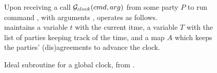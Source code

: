 \begin{figure}[ht]
  \begin{framed}
    \begin{minipage}[t]{\textwidth}
      \textrm{Upon receiving a call $\mathcal{G}_{clock}(cmd,arg)$ from
        some party $P$ to run command \cmd, with arguments \arg,
        \IdealGclock operates as follows.} \\
      \textrm{\IdealGclock maintains a variable $t$ with the current itme,
        a variable $T$ with the list of parties keeping track of the time,
        and a map $A$ which keeps the parties' (dis)agreements to advance the
        clock.}
    \end{minipage}
    \vspace*{0.5em}

    \begin{minipage}[t]{0.40\textwidth}
    \end{minipage}
    \hspace*{1.25em}
    \begin{minipage}[t]{0.60\textwidth}
    \end{minipage}
  \end{framed}
  \caption{Ideal subroutine for a global clock, from \cite{kkk21}.}
  \label{fig:gclock}
\end{figure}

